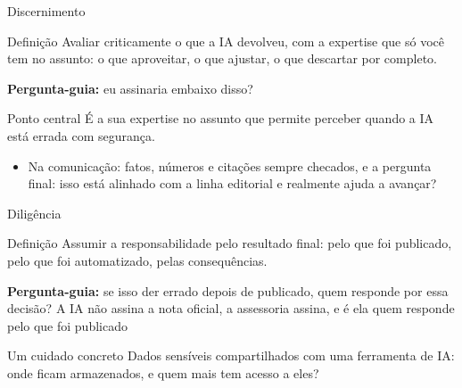 \documentclass[aspectratio=169,11pt]{beamer}
\begin{document}
\begin{frame}{Discernimento}
  \begin{notebox}{Definição}
    \small Avaliar criticamente o que a IA devolveu, com a expertise que só você tem no assunto: o que aproveitar, o que ajustar, o que descartar por completo.
  \end{notebox}
  \vspace{0.1cm}
  \textbf{Pergunta-guia:} eu assinaria embaixo disso?
  \vspace{0.1cm}
  \begin{alertbox}{Ponto central}
    \small É a sua expertise no assunto que permite perceber quando a IA está errada com segurança.
  \end{alertbox}
  \vspace{0.1cm}
  \begin{itemize}
    \item Na comunicação: fatos, números e citações sempre checados, e a pergunta final: isso está alinhado com a linha editorial e realmente ajuda a avançar? 
  \end{itemize}
\end{frame}

\begin{frame}{Diligência}
  \begin{notebox}{Definição}
    \small Assumir a responsabilidade pelo resultado final: pelo que foi publicado, pelo que foi automatizado, pelas consequências.
  \end{notebox}

  \textbf{Pergunta-guia:} se isso der errado depois de publicado, quem responde por essa decisão? A IA não assina a nota oficial, a assessoria assina, e é ela quem responde pelo que foi publicado

  \begin{alertbox}{Um cuidado concreto}
    \small Dados sensíveis compartilhados com uma ferramenta de IA: onde ficam armazenados, e quem mais tem acesso a eles?
  \end{alertbox}

\end{frame}
\end{document}
